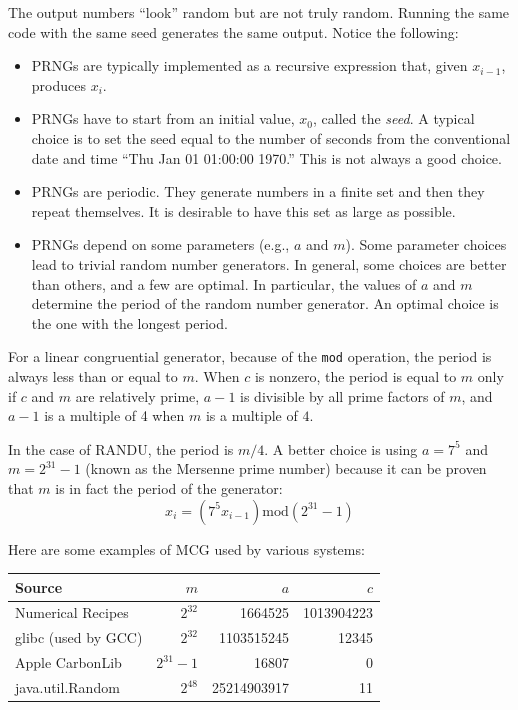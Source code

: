 \documentclass[justified,sixbynine]{tufte-book}
\def\ft{\small\tt}
\theoremstyle{plain}%
\theoremstyle{definition}
\theoremstyle{remark}
\begin{document}
\begin{fullwidth}
The output numbers ``look'' random but are not truly random. Running the same code with the same seed generates the same output. Notice the following:

\begin{itemize}
\item  PRNGs are typically implemented as a recursive expression that, given $%
x_{i-1}$, produces $x_i$.



\item  PRNGs have to start from an initial value, $x_0$, called the {\it seed}.
A typical choice is to set the seed equal to the number of seconds from the
conventional date and time ``Thu Jan 01 01:00:00 1970.'' This is not always
a good choice.

\item PRNGs are periodic. They generate numbers in a finite set and then they repeat themselves. It is desirable to have this set as large as possible.

\item  PRNGs depend on some parameters (e.g., $a$ and $m$). Some
parameter choices lead to trivial random number generators. In
general, some choices are better than others, and a few are optimal. In
particular, the values of $a$ and $m$ determine the period of the random
number generator. An optimal choice is the one with the longest period.
\end{itemize}

For a linear congruential generator, because of the {\ft mod} operation, the period is always less than or equal to $m$. When $c$ is nonzero, the period is equal to $m$ only if $c$ and $m$ are relatively prime, $a-1$ is divisible by all prime factors of $m$, and $a-1$ is a multiple of 4 when $m$ is a multiple of $4$.

In the case of RANDU, the period is $m/4$. A better choice is using $a=7^5$ and $m=2^{31}-1$ (known as the Mersenne prime number) because it can be proven that $m$ is in fact the period of the generator:
\begin{equation}
x_i=(7^5x_{i-1})\textrm{mod}(2^{31}-1)  \label{Mersenne}
\end{equation}

Here are some examples of MCG used by various systems:

\begin{tabular}{|lrrr|} \hline
Source & $m$ & $a$ & $c$ \\ \hline
Numerical Recipes & $2^{32}$ & 1664525 & 1013904223 \\
glibc (used by GCC) & $2^{32}$ & 1103515245 & 12345 \\
Apple CarbonLib & $2^{31} - 1$ & 16807 & 0 \\
java.util.Random & $2^{48}$ & 25214903917 & 11 \\ \hline
\end{tabular}


\end{fullwidth}
\end{document}
